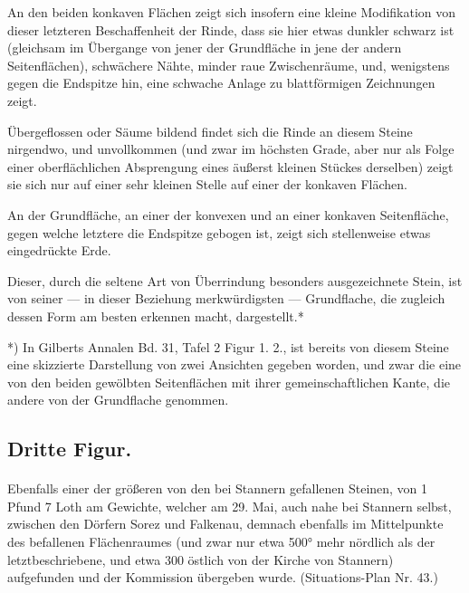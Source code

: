 \documentclass[a4paper, 11pt, oneside, german]{article}
\begin{document}
An den beiden konkaven Flächen zeigt sich insofern eine kleine Modifikation von dieser letzteren Beschaffenheit der Rinde, dass sie hier etwas dunkler schwarz ist (gleichsam im Übergange von jener der Grundfläche in jene der andern Seitenflächen), schwächere Nähte, minder raue Zwischenräume, und, wenigstens gegen die Endspitze hin, eine schwache Anlage zu blattförmigen Zeichnungen zeigt.

Übergeflossen oder Säume bildend findet sich die Rinde an diesem Steine nirgendwo, und unvollkommen (und zwar im höchsten Grade, aber nur als Folge einer oberflächlichen Absprengung eines äußerst kleinen Stückes derselben) zeigt sie sich nur auf einer sehr kleinen Stelle auf einer der konkaven Flächen.

An der Grundfläche, an einer der konvexen und an einer konkaven Seitenfläche, gegen welche letztere die Endspitze gebogen ist, zeigt sich stellenweise etwas eingedrückte Erde.

Dieser, durch die seltene Art von Überrindung besonders ausgezeichnete Stein, ist von seiner --- in dieser Beziehung merkwürdigsten --- Grundflache, die zugleich dessen Form am besten erkennen macht, dargestellt.*

*) In Gilberts Annalen Bd. 31, Tafel 2 Figur 1. 2., ist bereits von diesem Steine eine skizzierte Darstellung von zwei Ansichten gegeben worden, und zwar die eine von den beiden gewölbten Seitenflächen mit ihrer gemeinschaftlichen Kante, die andere von der Grundflache genommen.

\subsection{Dritte Figur.}
\paragraph{}
Ebenfalls einer der größeren von den bei Stannern gefallenen Steinen, von 1 Pfund 7 Loth am Gewichte, welcher am 29. Mai, auch nahe bei Stannern selbst, zwischen den Dörfern Sorez und Falkenau, demnach ebenfalls im Mittelpunkte des befallenen Flächenraumes (und zwar nur etwa 500° mehr nördlich als der letztbeschriebene, und etwa 300 östlich von der Kirche von Stannern) aufgefunden und der Kommission übergeben wurde. (Situations-Plan Nr. 43.)
\end{document}
